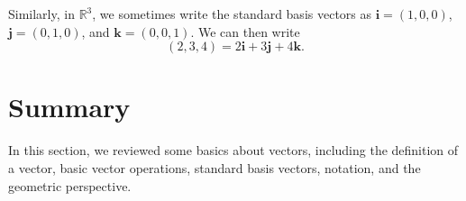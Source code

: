 \documentclass{ximera}
\begin{document}
Similarly, in $\mathbb{R}^3$, we sometimes write the standard basis vectors as $\mathbf{i} = (1,0,0)$, $\mathbf{j} = (0,1,0)$, and $\mathbf{k} = (0,0,1)$. We can then write
\[
(2,3,4) = 2\mathbf{i}+3\mathbf{j}+4\mathbf{k}.
\]

\section*{Summary}

In this section, we reviewed some basics about vectors, including the definition of a vector, basic vector operations, standard basis vectors, notation, and the geometric perspective.
\end{document}
